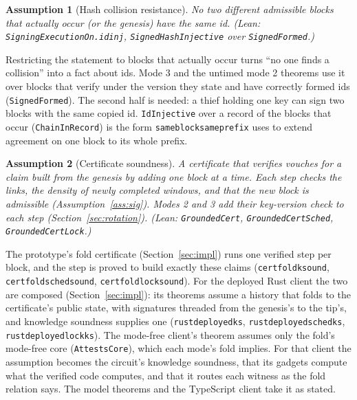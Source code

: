 \documentclass[10pt]{article}
\newtheorem{assumption}{Assumption}
\DeclareRobustCommand{\code}[1]{{\renewcommand{\_}{\textunderscore\allowbreak}\texttt{#1}}}
\begin{document}
\begin{assumption}[Hash collision resistance]\label{ass:hash}
No two different admissible blocks that actually occur (or the genesis)
have the same id.
\quad\textit{(Lean: \code{SigningExecutionOn.id\_inj},
\code{SignedHashInjective} over \code{SignedFormed}.)}
\end{assumption}

Restricting the statement to blocks that actually occur turns ``no one
finds a collision'' into a fact about ids. Mode 3 and the untimed
mode 2 theorems use it over blocks that verify under the version they
state and have correctly formed ids (\code{SignedFormed}). The second
half is needed: a thief holding one key can sign two blocks with the
same copied id. \code{IdInjective} over a record of the blocks that
occur (\code{ChainInRecord}) is the form \code{same\_block\_same\_prefix}
uses to extend agreement on one block to its whole prefix.

\begin{assumption}[Certificate soundness]\label{ass:cert}
A certificate that verifies vouches for a claim built from the genesis
by adding one block at a time. Each step checks the links, the density
of newly completed windows, and that the new block is admissible
(Assumption~\ref{ass:sig}). Modes 2 and 3 add their key-version check
to each step (Section~\ref{sec:rotation}).
\quad\textit{(Lean: \code{GroundedCert}, \code{GroundedCertSched},
\code{GroundedCertLock}.)}
\end{assumption}

The prototype's fold certificate (Section~\ref{sec:impl}) runs one
verified step per block, and the step is proved to build exactly these
claims (\code{cert\_fold\_k\_sound}, \code{cert\_fold\_sched\_sound},
\code{cert\_fold\_lock\_sound}). For the deployed Rust client the two
are composed (Section~\ref{sec:impl}): its theorems assume a history
that folds to the certificate's public state, with signatures threaded
from the genesis's to the tip's, and knowledge soundness supplies one
(\code{rust\_deployed\_ks}, \code{rust\_deployed\_sched\_ks},
\code{rust\_deployed\_lock\_ks}). The mode-free client's theorem assumes
only the fold's mode-free core (\code{AttestsCore}), which each mode's fold
implies. For that client the
assumption becomes the circuit's knowledge soundness, that its gadgets
compute what the verified code computes, and that it routes each
witness as the fold relation says. The model theorems and the
TypeScript client take it as stated.
\end{document}
